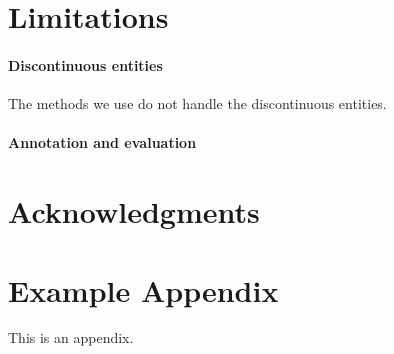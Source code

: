 \documentclass[11pt]{article}
\begin{document}
\section*{Limitations}

\paragraph{Discontinuous entities} The methods we use do not handle the discontinuous entities.

\paragraph{Annotation and evaluation}

\section*{Acknowledgments}




\appendix

\section{Example Appendix}
\label{sec:appendix}

This is an appendix.
\end{document}

